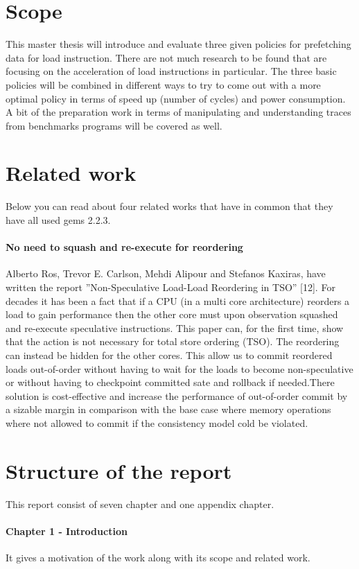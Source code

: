 \section{Scope}
\label{sec:scope}
This master thesis will introduce and evaluate three given policies for prefetching data
for load instruction. There are not much research to be found that are focusing on
the acceleration of load instructions in particular. The three basic policies will be
combined in different ways to try to come out with a more optimal policy in terms of
speed up (number of cycles) and power consumption. A bit of the preparation work
in terms of manipulating and understanding traces from benchmarks programs will
be covered as well.
 \section{Related work}
Below you can read about four related works that have in common that they have all
used gems 2.2.3. \fixme

\paragraph{No need to squash and re-execute for reordering} Alberto Ros, Trevor E. Carlson,
Mehdi Alipour and Stefanos Kaxiras, have written the report ”Non-Speculative
Load-Load Reordering in TSO” [12]\fixme. For decades it has been a fact that if a CPU
(in a multi core architecture) reorders a load to gain performance then the other
core must upon observation squashed and re-execute speculative instructions. This
paper can, for the first time, show that the action is not necessary for total store
ordering (TSO). The reordering can instead be hidden for the other cores. This allow
us to commit reordered loads out-of-order without having to wait for the loads to
become non-speculative or without having to checkpoint committed sate and rollback
if needed.There solution is cost-effective and increase the performance of out-of-order
commit by a sizable margin in comparison with the base case where memory operations
where not allowed to commit if the consistency model cold be violated.


\section {Structure of the report}
\label{Sec:struct}

This report consist of seven chapter and one appendix chapter. \fixme
\paragraph{Chapter 1 - Introduction} It gives a motivation of the work along with its scope
and related work.
